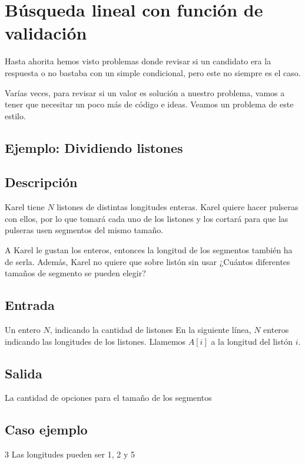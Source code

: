 \section{Búsqueda lineal con función de validación}

Hasta ahorita hemos visto problemas donde revisar si un candidato era la respuesta o no bastaba con un simple condicional, pero este no siempre es el caso.

Varías veces, para revisar si un valor es solución a nuestro problema, vamos a tener que necesitar un poco más de código e ideas. Veamos un problema de este estilo.

\subsection*{Ejemplo: Dividiendo listones}


\subsection*{Descripción}
Karel tiene \(N\) listones de distintas longitudes enteras. Karel quiere hacer pulseras con ellos, por lo que tomará cada uno de los listones y los cortará para que las pulseras usen segmentos del mismo tamaño.

A Karel le gustan los enteros, entonces la longitud de los segmentos también ha de serla. Además, Karel no quiere que sobre listón sin usar ¿Cuántos diferentes tamaños de segmento se pueden elegir?

\subsection*{Entrada}
Un entero \(N\), indicando la cantidad de listones
En la siguiente línea, \(N\) enteros indicando las longitudes de los listones. Llamemos \(A[i]\) a la longitud del listón \(i\).

\subsection*{Salida}
La cantidad de opciones para el tamaño de los segmentos

\subsection*{Caso ejemplo}
\begin{casebox3}
	{3}
	{Las longitudes pueden ser 1, 2 y 5}
\end{casebox3}	
